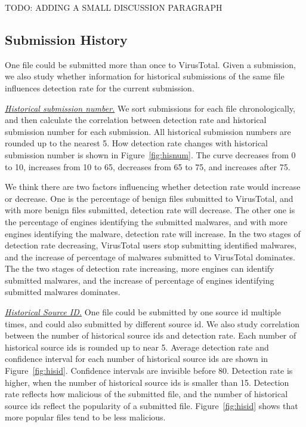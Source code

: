 {\color{red} TODO: ADDING A SMALL DISCUSSION PARAGRAPH}

\subsection{Submission History}
\label{sec:history}

One file could be submitted more than once to VirusTotal. 
Given a submission, we also study whether information for historical submissions of the same file influences detection rate for the current submission. 

{\textit{\underline{Historical submission number.}}}
We sort submissions for each file chronologically, and then calculate the correlation between detection rate and historical submission number for each submission. 
All historical submission numbers are rounded up to the nearest 5. 
How detection rate changes with historical submission number is shown in Figure~\ref{fig:hisnum}. 
The curve decreases from 0 to 10, increases from 10 to 65, decreases from 65 to 75, and increases after 75. 

We think there are two factors influencing whether detection rate would increase or decrease.
One is the percentage of benign files submitted to VirusTotal, 
and with more benign files submitted, detection rate will decrease.   
The other one is the percentage of engines identifying the submitted malwares, 
and with more engines identifying the malware, detection rate will increase. 
In the two stages of detection rate decreasing, 
VirusTotal users stop submitting identified malwares, 
and the increase of percentage of malwares submitted to VirusTotal dominates. 
The the two stages of detection rate increasing, 
more engines can identify submitted malwares, 
and the increase of percentage of engines identifying submitted malwares dominates. 

{\textit{\underline{Historical Source ID.}}}
One file could be submitted by one source id multiple times, and could also submitted by different source id. 
We also study correlation between the number of historical source ids and detection rate. 
Each number of historical source ids is rounded up to near 5. 
Average detection rate and confidence interval for each number of historical source ids are shown in Figure~\ref{fig:hisid}. 
Confidence intervals are invisible before 80. 
Detection rate is higher, when the number of historical source ids is smaller than 15. 
Detection rate reflects how malicious of the submitted file, and the number of historical source ids reflect the popularity of a submitted file.
Figure~\ref{fig:hisid} shows that more popular files tend to be less malicious.   


